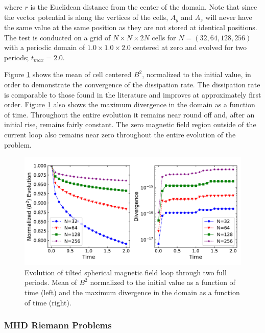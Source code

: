 \noindent where $r$ is the Euclidean distance from the center of the domain. Note that since the vector potential is along the vertices of the cells, $A_y$ and $A_z$ will never have the same value at the same position as they are not stored at identical positions. The test is conducted on a grid of $N\times N\times 2N$ cells for $N=(32, 64, 128, 256)$ with a periodic domain of $1.0\times1.0\times2.0$ centered at zero and evolved for two periods; $t_{max} = 2.0$.

Figure \ref{fig:afl} shows the mean of cell centered $B^2$, normalized to the initial value, in order to demonstrate the convergence of the dissipation rate. The dissipation rate is comparable to those found in the literature \citep{stone_athena_2008} and improves at approximately first order. Figure \ref{fig:afl} also shows the maximum divergence in the domain as a function of time. Throughout the entire evolution it remains near round off and, after an initial rise, remains fairly constant. The zero magnetic field region outside of the current loop also remains near zero throughout the entire evolution of the problem.
 
\begin{figure}[ht!]
    \includegraphics[width=\linewidth]{assets/3-mhd-tests/afl.pdf}
    \caption{Evolution of tilted spherical magnetic field loop through two full periods. Mean of $B^2$ normalized to the initial value as a function of time (left) and the maximum divergence in the domain as a function of time (right). }
    \label{fig:afl}
\end{figure}

\subsubsection{MHD Riemann Problems}
\label{sec:riemann}

